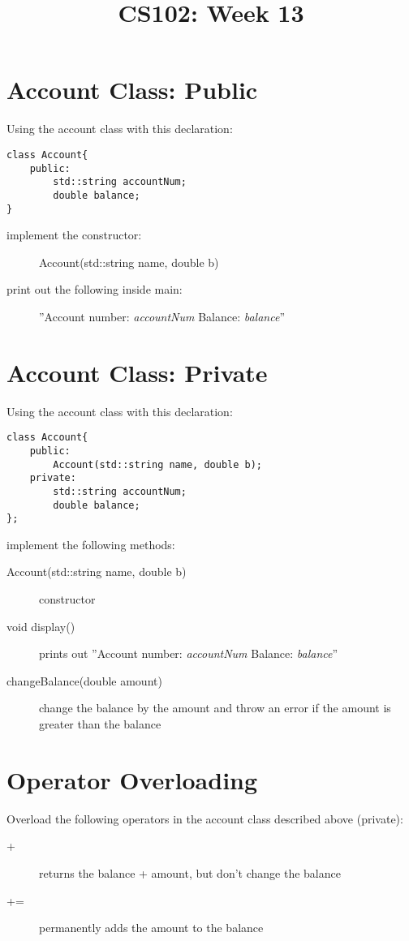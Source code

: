 \documentclass{article}
\begin{document}
\title{CS102: Week 13}

\maketitle
\section*{Account Class: Public}
Using the account class with this declaration: 
\begin{lstlisting}
class Account{
    public:
        std::string accountNum;
        double balance;
}
\end{lstlisting}
\begin{description}
    \item[implement the constructor:]Account(std::string name, double b) 
    \item[print out the following inside main:] ''Account number: \textit{accountNum} Balance: \textit{balance}''
\end{description}

\section*{Account Class: Private}
Using the account class with this declaration:
\begin{lstlisting}
class Account{
    public:
        Account(std::string name, double b);
    private:
        std::string accountNum;
        double balance;
};
\end{lstlisting}
implement the following methods:
\begin{description}
    \item [Account(std::string name, double b)]
        constructor
    \item [void display()]
     prints out ''Account number: \textit{accountNum}
     Balance: \textit{balance}''
    \item[changeBalance(double amount)]
    change the balance by the amount and throw an error if the amount
    is greater than the balance
\end{description}

\section*{Operator Overloading}
Overload the following operators in the account class described above (private):
\begin{description}
    \item[+] returns the balance + amount, but don't change the balance
    \item[+=] permanently adds the amount to the balance
\end{description}
\end{document}
